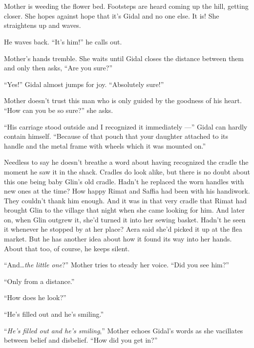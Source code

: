 \documentclass[twoside,11pt,openany]{book}
\begin{document}
\bigskip

\chapter{}

Mother is weeding the flower bed. Footsteps are heard coming up the hill, getting closer. She hopes against hope that
it's Gidal and{ }no one else. It is! She straightens up and waves.

He waves back. ``It's him!'' he calls out.

Mother's hands tremble. She waits until Gidal closes the distance between them and only then
asks,{ }``Are you sure?''

``Yes!'' Gidal almost jumps for joy. ``Absolutely sure!''

Mother doesn't trust this man who is only guided by the goodness of his heart. ``How can you be so sure?'' she asks.

``His carriage stood outside and I recognized it immediately ---'' Gidal can hardly contain
himself. ``Because of that pouch that your daughter attached to its handle and the metal frame with wheels
which it was mounted on.''

Needless to say he doesn't breathe a word about having recognized the cradle the moment he saw it in the shack. Cradles
do look alike, but there is no doubt about this one being baby Glin's old cradle. Hadn't he replaced the worn handles
with new ones at the time? How happy Rimat and Saffia had been with his handiwork. They couldn't thank him
enough{. }And it was in that very cradle that Rimat had
brought{ }Glin to the village that night when she came looking for him. And
later on, when Glin outgrew it, she'd turned it into her sewing basket. Hadn't he seen it whenever he stopped
by{ }at{ }her place? Aera said she'd picked it up at the flea market. But he has
another idea about how it found its way into her hands. About that too, of course, he keeps silent.

``And{\ldots}\textit{the little one}?'' Mother tries to steady her voice. ``Did
you see him?''

``Only from a distance.''

``How does he look?''

``He's filled out and he's smiling.''

``\textit{He's filled out and he{'}s smiling},'' Mother echoes Gidal's words as
she vacillates between belief and disbelief. ``How did you get in?''
\end{document}

